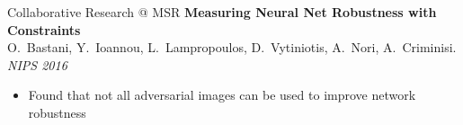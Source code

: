 \documentclass[t,xcolor=dvipsnames]{beamer}
\begin{document}

\begin{frame}{Collaborative Research @ MSR}
\textbf{Measuring Neural Net Robustness with Constraints}\\{\footnotesize O.\ Bastani, Y.\ Ioannou, L.\ Lampropoulos, D.\ Vytiniotis, A.\ Nori, A.\ Criminisi.\\\textit{NIPS 2016}}
\begin{itemize}
    \item Found that not all adversarial images can be used to improve network robustness
\end{itemize}
\end{frame}
\end{document}
